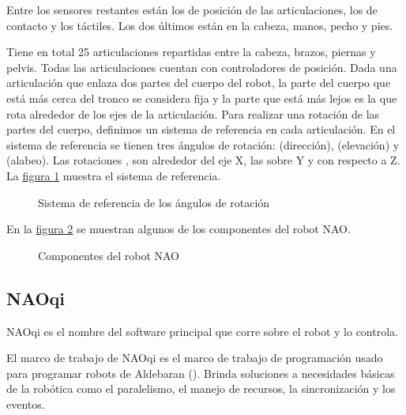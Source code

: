 Entre los sensores restantes están los de posición de las articulaciones, los
de contacto y los táctiles. Los dos últimos están en la cabeza, manos, pecho y
pies.

Tiene en total 25 articulaciones repartidas entre la cabeza, brazos,
piernas y pelvis. Todas las articulaciones cuentan con controladores de posición.
Dada una articulación que enlaza dos partes del cuerpo del robot, la parte
del cuerpo que está más cerca del tronco se considera fija y la parte que está
más lejos  es la que rota alrededor de los ejes de la articulación.
Para realizar una rotación de las partes del cuerpo, definimos un sistema
de referencia en cada articulación.
En el sistema de referencia se tienen tres ángulos de rotación:
 (dirección),  (elevación) y  (alabeo).
Las rotaciones , son
alrededor del eje X, las   sobre Y y  con respecto a Z. La
\hyperref[\detokenize{chapter_one/naoqi:rollpitchyaw-frame}]{figura \ref{\detokenize{chapter_one/naoqi:rollpitchyaw-frame}}} muestra el sistema de referencia.

\begin{figure}[htbp]
\centering
\capstart

\noindent{}
\caption{Sistema de referencia de los ángulos de rotación}\label{\detokenize{chapter_one/naoqi:rollpitchyaw-frame}}\end{figure}

En la \hyperref[\detokenize{chapter_one/naoqi:nao-config}]{figura \ref{\detokenize{chapter_one/naoqi:nao-config}}} se muestran algunos de los componentes del robot NAO.

\begin{figure}[htbp]
\centering
\capstart

\noindent{}
\caption{Componentes del robot NAO}\label{\detokenize{chapter_one/naoqi:nao-config}}\end{figure}


\subsection{NAOqi}
\label{\detokenize{chapter_one/naoqi:naoqi}}
NAOqi es el nombre del software principal que corre sobre el robot y lo
controla.

El marco de trabajo de NAOqi es el marco de trabajo de programación
usado para programar robots de Aldebaran (). Brinda
soluciones a necesidades básicas de la robótica como el paralelismo, el manejo
de recursos, la sincronización y los eventos.


